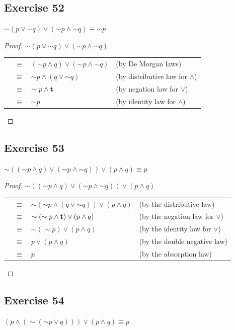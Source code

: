 \documentclass[14pt]{extarticle}
\begin{document}
\subsection{Exercise 52} ${\sim (p \vee {\sim q})} \vee ({\sim p} \wedge {\sim
q}) \equiv {\sim p}$

\begin{proof} ${\sim (p \vee {\sim q})} \vee ({\sim p} \wedge {\sim q})$
\begin{tabular}{rcll} & $\equiv$ & $({\sim p} \wedge q) \vee ({\sim p} \wedge
{\sim q})$ & (by De Morgan laws) \\ & $\equiv$ & ${\sim p} \wedge (q \vee {\sim
q})$ & (by distributive law for $\wedge$) \\ & $\equiv$ & ${\sim p} \wedge
{\bf t}$ & (by negation law for $\vee$) \\ & $\equiv$ & ${\sim p}$ & (by identity
law for $\wedge$) \\ \end{tabular} \end{proof}

\subsection{Exercise 53} $\sim(({\sim p} \wedge q) \vee ({\sim p} \wedge {\sim
q})) \vee (p \wedge q) \equiv p$

\begin{proof} $\sim(({\sim p} \wedge q) \vee ({\sim p} \wedge {\sim q})) \vee (p
\wedge q)$

\begin{tabular}{rcll} & $\equiv$ & $\sim({\sim p} \wedge (q \vee {\sim q})) \vee
(p \wedge q)$ & (by the distributive law) \\ & $\equiv$ & $\sim({\sim p} \wedge
{\bf t}) \vee (p \wedge q)$ & (by the negation law for $\vee$) \\ & $\equiv$ &
$\sim({\sim p}) \vee (p \wedge q)$ & (by the identity law for $\vee$) \\ &
$\equiv$ & $p \vee (p \wedge q)$ & (by the double negative law) \\ & $\equiv$ &
$p$ & (by the absorption law) \\ \end{tabular} \end{proof}

\subsection{Exercise 54} $(p \wedge ({\sim ({\sim p} \vee q)})) \vee (p \wedge
q) \equiv p$
\end{document}

